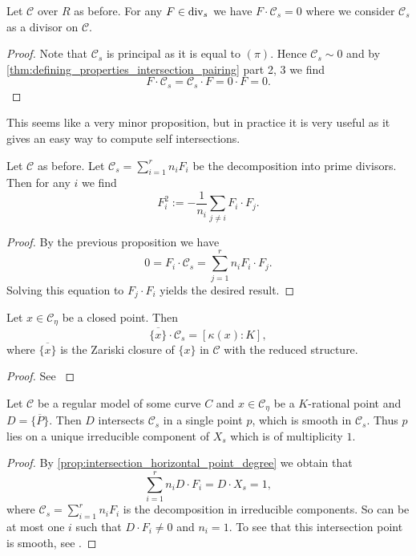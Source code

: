 \begin{proposition}
	Let $\mathscr C$ over $R$ as before. 
	For any $F \in \operatorname{div}_s$ we have $F\cdot \mathscr C_s = 0$ where we consider $\mathscr C_s$ as a divisor on $\mathscr C$. 
\end{proposition}
\begin{proof}
	Note that $\mathscr C_s$ is principal as it is equal to $(\pi)$. 
	Hence $\mathscr C_s \sim 0$ and by \cref{thm:defining_properties_intersection_pairing} part 2, 3 we find \[
	F\cdot \mathscr C_s = \mathscr C_s \cdot F = 0 \cdot F = 0
	.\] 
\end{proof}
This seems like a very minor proposition, but in practice it is very useful as it gives an easy way to compute self intersections. 
\begin{corollary}\label{cor:compute_self_intersection}
	Let $\mathscr C$ as before. 
	Let $\mathscr C_s = \sum_{i =1}^{r} n_i F_i$ be the decomposition into prime divisors. 
	Then for any $i$ we find \[
		F^2_i := -\frac{1}{n_i} \sum_{j \ne i} F_i \cdot F_j
	.\] 
\end{corollary}
\begin{proof}
	By the previous proposition we have \[
	 0 = F_i \cdot \mathscr C_s = \sum_{j = 1}^{r} n_i F_i \cdot F_j
	.\] 
	Solving this equation to $F_j \cdot F_i$ yields the desired result. 
\end{proof}

\begin{proposition}\label{prop:intersection_horizontal_point_degree}
	Let $x \in \mathscr C_\eta$ be a closed point. 
	Then \[
		\overline{\{x\} }\cdot \mathscr C_s = [\kappa(x): K]
	,\] 
	where $\overline{\{x\} }$ is the Zariski closure of $\{x\} $ in $\mathscr C$ with the reduced structure. 
\end{proposition}
\begin{proof}
	See \cite[prop.\ 9.1.30]{liuAlgebraicGeometryArithmetic2002}
\end{proof}


\begin{corollary}\label{cor:closure_K_rational_point}
	Let $\mathscr C$ be a regular model of some curve $C$ and $x \in \mathscr C_\eta$ be a $K$-rational point and $D = \overline{\{P\} } $. 
	Then $D$ intersects $\mathscr C_s$ in a single point $p$, which is smooth in $\mathscr C_s$. 
	Thus $p$ lies on a unique irreducible component of $X_s$ which is of multiplicity $1$. 
\end{corollary}
\begin{proof}
	By \cref{prop:intersection_horizontal_point_degree} we obtain that \[
	\sum_{i = 1}^{r}  n_i D\cdot F_i = D \cdot X_s = 1
	,\] 
	where $\mathscr C_s = \sum_{i =1}^{r} n_i F_i$ is the decomposition in irreducible components. 
	So can be at most one $i$ such that $D\cdot F_i \ne  0$ and $n_i = 1$. 
	To see that this intersection point is smooth, see \cite[cor.\ 9.1.31]{liuAlgebraicGeometryArithmetic2002}.
\end{proof}

